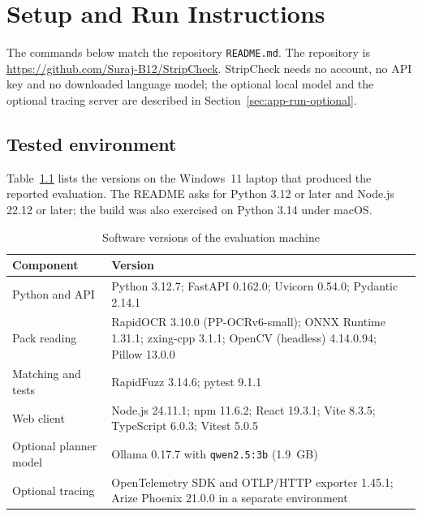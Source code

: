 \chapter{Setup and Run Instructions}
\label{app:run}

The commands below match the repository \texttt{README.md}. The repository is \url{https://github.com/Suraj-B12/StripCheck}. StripCheck needs no account, no API key and no downloaded language model; the optional local model and the optional tracing server are described in Section~\ref{sec:app-run-optional}.

\section{Tested environment}
\label{sec:app-run-env}

Table~\ref{tab:app-versions} lists the versions on the Windows~11 laptop that produced the reported evaluation. The README asks for Python 3.12 or later and Node.js 22.12 or later; the build was also exercised on Python 3.14 under macOS.

\begin{table}[H]
\centering
\caption{Software versions of the evaluation machine}
\label{tab:app-versions}
\small
\begin{tabularx}{\linewidth}{@{}l >{\raggedright\arraybackslash}X@{}}
\toprule
\textbf{Component} & \textbf{Version} \\
\midrule
Python and API & Python 3.12.7; FastAPI 0.162.0; Uvicorn 0.54.0; Pydantic 2.14.1 \\
Pack reading & RapidOCR 3.10.0 (PP-OCRv6-small); ONNX Runtime 1.31.1; zxing-cpp 3.1.1; OpenCV (headless) 4.14.0.94; Pillow 13.0.0 \\
Matching and tests & RapidFuzz 3.14.6; pytest 9.1.1 \\
Web client & Node.js 24.11.1; npm 11.6.2; React 19.3.1; Vite 8.3.5; TypeScript 6.0.3; Vitest 5.0.5 \\
Optional planner model & Ollama 0.17.7 with \texttt{qwen2.5:3b} (1.9~GB) \\
Optional tracing & OpenTelemetry SDK and OTLP/HTTP exporter 1.45.1; Arize Phoenix 21.0.0 in a separate environment \\
\bottomrule
\end{tabularx}
\end{table}

